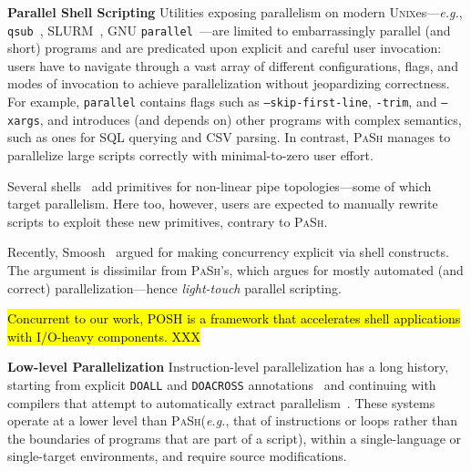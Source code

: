 \documentclass[sigplan, review, screen, anonymous]{acmart}
\newcommand{\eg}{{\em e.g.}, }
\newcommand{\heading}[1]{\vspace{4pt}\noindent\textbf{#1}\enspace}
\newcommand{\ttt}[1]{\texttt{#1}}
\newcommand{\todo}[1]{\hl{#1}\xspace}
\newcommand{\sys}{{\scshape PaSh}\xspace}
\newcommand{\unix}{{\scshape Unix}\xspace}
\begin{document}
\heading{Parallel Shell Scripting}
Utilities exposing parallelism on modern \unix{}es---\eg \ttt{qsub}~\cite{gentzsch2001sun}, \textsc{SLURM}~\cite{yoo2003slurm}, \textsc{GNU} \ttt{parallel}~\cite{Tange2011a}---are limited to embarrassingly parallel (and short) programs and are predicated upon explicit and careful user invocation:
  users have to navigate through a vast array of different configurations, flags, and modes of invocation to achieve parallelization without jeopardizing correctness. %
For example, \ttt{parallel} contains flags such as \ttt{--skip-first-line}, \ttt{-trim}, and \ttt{--xargs},
and introduces (and depends on) other programs with complex semantics, such as ones for SQL querying and CSV parsing.
In contrast, \sys manages to parallelize large scripts correctly with minimal-to-zero user effort.

Several shells~\cite{duff1990rc, mcdonald1988support, dagsh:17} add primitives for non-linear pipe topologies---some of which target parallelism.
Here too, however, users are expected to manually rewrite scripts to exploit these new primitives, contrary to \sys.

Recently, Smoosh~\cite{smoosh:18} argued for making concurrency explicit via shell constructs.
The argument is dissimilar from \sys's, which argues for mostly automated (and correct) parallelization---hence \emph{light-touch} parallel scripting.

\todo{Concurrent to our work, POSH is a framework that accelerates shell applications with I/O-heavy components. XXX}

\heading{Low-level Parallelization}
Instruction-level parallelization has a long history, starting from explicit \ttt{DOALL} and \ttt{DOACROSS} annotations~\cite{par1, par2} and continuing with compilers that attempt to automatically extract parallelism~\cite{padua1993polaris,hall1996maximizing}.
These systems operate at a lower level than \sys (\eg that of instructions or loops rather than the boundaries of programs that are part of a script), within a single-language or single-target environments, and require source modifications.
\end{document}
